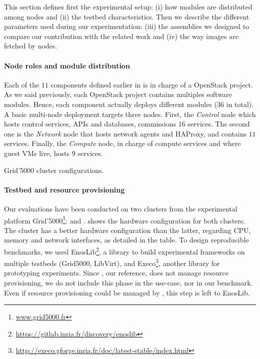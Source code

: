 This section defines first the experimental setup: (i) how modules are
distributed among nodes and (ii) the testbed characteristics. Then we describe
the different parameters used during our experimentation: (iii) the assemblies
we designed to compare our contribution with the related work and (iv) the way
\docker images are fetched by nodes.

\paragraph{Node roles and module distribution}
Each of the $11$ components defined earlier in \kolla is in charge of a
OpenStack project. As we said previously, each OpenStack project contains
multiples software modules. Hence, each component actually deploys different
modules ($36$ in total). A basic multi-node \kolla deployment targets three
nodes. First, the \emph{Control} node which hosts control services, APIs and
databases, commissions $16$ services. The second one is the \emph{Network} node
that hosts network agents and HAProxy, and contains $11$ services. Finally, the
\emph{Compute} node, in charge of compute services and where guest VMs live,
hosts $9$ services.

\begin{table}
  \begin{center}
    \small
    
    \caption{Grid'5000 cluster configurations.}
    \label{tab:g5k}
  \end{center}
\end{table}

\paragraph{Testbed and resource provisioning}
Our evaluations have been conducted on two clusters from the experimental
platform Grid'5000\footnote{\url{www.grid5000.fr}}: \ecotype and \nova. \Cref
shows the hardware configuration for both clusters. The cluster \ecotype has a
better hardware configuration than the latter, regarding CPU, memory and network
interfaces, as detailed in the table. To design reproducible benchmarks, we
used EnosLib\footnote{\url{https://gitlab.inria.fr/discovery/enoslib}}, a
library to build experimental frameworks on multiple testbeds (\eg Grid5000,
LibVirt), and
Execo\footnote{\url{http://execo.gforge.inria.fr/doc/latest-stable/index.html}},
another library for prototyping experiments. Since \kolla, our reference, does
not manage resource provisioning, we do not include this phase in the use-case,
nor in our benchmark. Even if resource provisioning could be managed by \mad,
this step is left to EnosLib.

